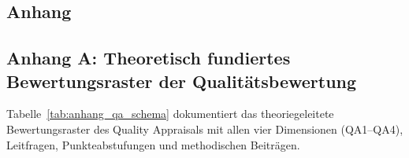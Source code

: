 \begin{landscape}
\section*{Anhang}
\label{sec:anhang}

\subsection*{Anhang A: Theoretisch fundiertes Bewertungsraster der Qualitätsbewertung}
\label{subsec:anhang_qa_schema}

Tabelle~\ref{tab:anhang_qa_schema} dokumentiert das theoriegeleitete Bewertungsraster des Quality Appraisals mit allen vier Dimensionen (QA1--QA4), Leitfragen, Punkteabstufungen und methodischen Beiträgen.


\end{landscape}
